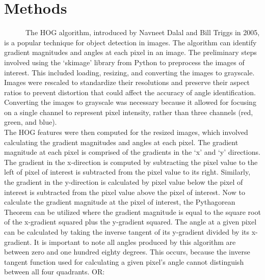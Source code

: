 \documentclass[
  letterpaper,
  DIV=11,
  numbers=noendperiod]{scrreprt}
\begin{document}

\hypertarget{methods}{%
\chapter{Methods}\label{methods}}

~~~~~~The HOG algorithm, introduced by Navneet Dalal and Bill Triggs in
2005, is a popular technique for object detection in images. The
algorithm can identify gradient magnitudes and angles at each pixel in
an image. The preliminary steps involved using the `skimage' library
from Python to preprocess the images of interest. This included loading,
resizing, and converting the images to grayscale. Images were rescaled
to standardize their resolutions and preserve their aspect ratios to
prevent distortion that could affect the accuracy of angle
identification. Converting the images to grayscale was necessary because
it allowed for focusing on a single channel to represent pixel
intensity, rather than three channels (red, green, and blue).\\
\hspace*{0.333em}\hspace*{0.333em}\hspace*{0.333em}\hspace*{0.333em}\hspace*{0.333em}\hspace*{0.333em}The
HOG features were then computed for the resized images, which involved
calculating the gradient magnitudes and angles at each pixel. The
gradient magnitude at each pixel is comprised of the gradients in the
`x' and `y' directions. The gradient in the x-direction is computed by
subtracting the pixel value to the left of pixel of interest is
subtracted from the pixel value to its right. Similarly, the gradient in
the y-direction is calculated by pixel value below the pixel of interest
is subtracted from the pixel value above the pixel of interest. Now to
calculate the gradient magnitude at the pixel of interest, the
Pythagorean Theorem can be utilized where the gradient magnitude is
equal to the square root of the x-gradient squared plus the y-gradient
squared. The angle at a given pixel can be calculated by taking the
inverse tangent of its y-gradient divided by its x-gradient. It is
important to note all angles produced by this algorithm are between zero
and one hundred eighty degrees. This occurs, because the inverse tangent
function used for calculating a given pixel's angle cannot distinguish
between all four quadrants. OR:
\end{document}

